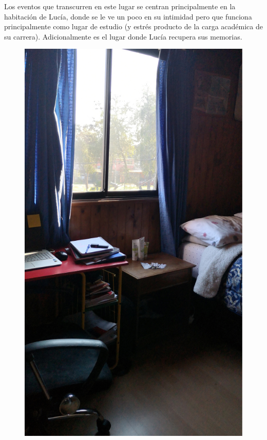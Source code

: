 Los eventos que transcurren en este lugar se centran principalmente en la habitación de Lucía, donde se le ve un poco en su intimidad pero que funciona principalmente como lugar de estudio (y estrés producto de la carga académica de su carrera). Adicionalmente es el lugar donde Lucía recupera sus memorias.

\begin{figure}[ht]
	\centering
	\begin{minipage}{0.45\textwidth}
   		\includegraphics[scale=.3]{imgs/habitacion.jpg}

\end{minipage}
\end{figure}
